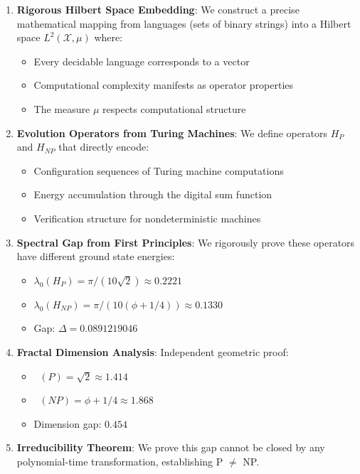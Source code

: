 \documentclass[12pt]{article}
\theoremstyle{plain}
\theoremstyle{definition}
\DeclareMathOperator{\dimfrac}{dim_{frac}}
\newcommand{\goldenratio}{\phi}
\begin{document}
\begin{enumerate}
\item \textbf{Rigorous Hilbert Space Embedding}: We construct a precise mathematical mapping from languages (sets of binary strings) into a Hilbert space $L^2(\mathcal{X}, \mu)$ where:
   \begin{itemize}
   \item Every decidable language corresponds to a vector
   \item Computational complexity manifests as operator properties
   \item The measure $\mu$ respects computational structure
   \end{itemize}

\item \textbf{Evolution Operators from Turing Machines}: We define operators $H_P$ and $H_{NP}$ that directly encode:
   \begin{itemize}
   \item Configuration sequences of Turing machine computations
   \item Energy accumulation through the digital sum function
   \item Verification structure for nondeterministic machines
   \end{itemize}

\item \textbf{Spectral Gap from First Principles}: We rigorously prove these operators have different ground state energies:
   \begin{itemize}
   \item $\lambda_0(H_P) = \pi/(10\sqrt{2}) \approx 0.2221$
   \item $\lambda_0(H_{NP}) = \pi/(10(\phi + 1/4)) \approx 0.1330$
   \item Gap: $\Delta = 0.0891219046$
   \end{itemize}

\item \textbf{Fractal Dimension Analysis}: Independent geometric proof:
   \begin{itemize}
   \item $\dimfrac(P) = \sqrt{2} \approx 1.414$
   \item $\dimfrac(NP) = \goldenratio + 1/4 \approx 1.868$
   \item Dimension gap: $0.454$
   \end{itemize}

\item \textbf{Irreducibility Theorem}: We prove this gap cannot be closed by any polynomial-time transformation, establishing P $\neq$ NP.
\end{enumerate}
\end{document}
